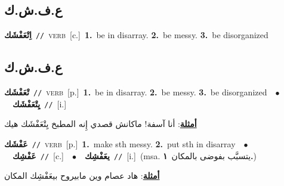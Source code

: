 \documentclass[10pt,a4paper,twoside]{article} %
\begin{document}
\begin{multicols}{2}
\vspace{-3mm}
\subsection*{\color{blue}\foreignlanguage{arabic}{ع.ف.ش.ك}\color{blue}{}} 

{\setlength\topsep{0pt}\textbf{\foreignlanguage{arabic}{اِتْعَفْشَك}}\ {\color{gray}\texttt{//}\color{black}}\ \textsc{verb}\ [c.]\ \textbf{1.}~be in disarray.  \textbf{2.}~be messy.  \textbf{3.}~be disorganized\ } \vspace{2mm}

\vspace{-3mm}
\subsection*{\color{blue}\foreignlanguage{arabic}{ع.ف.ش.ك}\color{blue}{ (ntws)}} 

{\setlength\topsep{0pt}\textbf{\foreignlanguage{arabic}{تْعَفْشَك}}\ {\color{gray}\texttt{//}\color{black}}\ \textsc{verb}\ [p.]\ \textbf{1.}~be in disarray.  \textbf{2.}~be messy.  \textbf{3.}~be disorganized\ \ $\bullet$\ \ \setlength\topsep{0pt}\textbf{\foreignlanguage{arabic}{يِتْعَفْشَك}}\ {\color{gray}\texttt{//}\color{black}}\ [i.]\  \begin{flushright}\color{gray}\foreignlanguage{arabic}{\textbf{\underline{\foreignlanguage{arabic}{أمثلة}}}: أنا آسفة! ماكانش قصدي إِنه المطبخ يِتْعَفْشَك هيك}\end{flushright}\color{black}} \vspace{2mm}

{\setlength\topsep{0pt}\textbf{\foreignlanguage{arabic}{عَفْشَك}}\ {\color{gray}\texttt{//}\color{black}}\ \textsc{verb}\ [p.]\ \textbf{1.}~make sth messy.  \textbf{2.}~put sth in disarray\ \ $\bullet$\ \ \setlength\topsep{0pt}\textbf{\foreignlanguage{arabic}{عَفْشِك}}\ {\color{gray}\texttt{//}\color{black}}\ [c.]\ \ $\bullet$\ \ \setlength\topsep{0pt}\textbf{\foreignlanguage{arabic}{يعَفْشِك}}\ {\color{gray}\texttt{//}\color{black}}\ [i.]\ \color{gray}(msa. \foreignlanguage{arabic}{يتسبَّب بفوضى بالمكان}~\foreignlanguage{arabic}{\textbf{١.}})\color{black}\  \begin{flushright}\color{gray}\foreignlanguage{arabic}{\textbf{\underline{\foreignlanguage{arabic}{أمثلة}}}: هاد عصام وين مابيروح بيعَفْشِك المكان}\end{flushright}\color{black}} \vspace{2mm}


\end{multicols}
\end{document}
